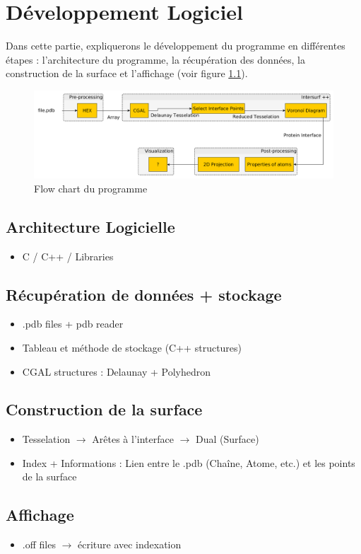 \chapter{Développement Logiciel}

Dans cette partie, expliquerons le développement du programme en différentes étapes :
l'architecture du programme, la récupération des données, la construction de la surface
et l'affichage (voir figure \ref{fig::flow_chart}).

\begin{figure}[ht]
\centering
  \includegraphics[width=\textwidth]{figures/flow_chart.png}
  \caption{Flow chart du programme}
  \label{fig::flow_chart}
\end{figure}



\section{Architecture Logicielle}
\begin{itemize}
  \item C / C++ / Libraries
\end{itemize}


\section{Récupération de données + stockage}
\begin{itemize}
  \item .pdb files + pdb reader
  \item Tableau et méthode de stockage (C++ structures)
  \item CGAL structures : Delaunay + Polyhedron
\end{itemize}

\section{Construction de la surface}
\begin{itemize}
  \item Tesselation $\to$ Arêtes à l'interface $\to$ Dual (Surface)
  \item Index + Informations : Lien entre le .pdb (Chaîne, Atome, etc.) et les points de la surface
\end{itemize}

\section{Affichage}
\begin{itemize}
  \item .off files $\to$ écriture avec indexation
\end{itemize}
